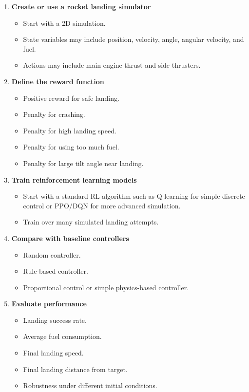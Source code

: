\documentclass[11pt,a4paper]{article}
\begin{document}
\begin{enumerate}
    \item \textbf{Create or use a rocket landing simulator}
    \begin{itemize}
        \item Start with a 2D simulation.
        \item State variables may include position, velocity, angle, angular velocity, and fuel.
        \item Actions may include main engine thrust and side thrusters.
    \end{itemize}

    \item \textbf{Define the reward function}
    \begin{itemize}
        \item Positive reward for safe landing.
        \item Penalty for crashing.
        \item Penalty for high landing speed.
        \item Penalty for using too much fuel.
        \item Penalty for large tilt angle near landing.
    \end{itemize}

    \item \textbf{Train reinforcement learning models}
    \begin{itemize}
        \item Start with a standard RL algorithm such as Q-learning for simple discrete control or PPO/DQN for more advanced simulation.
        \item Train over many simulated landing attempts.
    \end{itemize}

    \item \textbf{Compare with baseline controllers}
    \begin{itemize}
        \item Random controller.
        \item Rule-based controller.
        \item Proportional control or simple physics-based controller.
    \end{itemize}

    \item \textbf{Evaluate performance}
    \begin{itemize}
        \item Landing success rate.
        \item Average fuel consumption.
        \item Final landing speed.
        \item Final landing distance from target.
        \item Robustness under different initial conditions.
    \end{itemize}
\end{enumerate}
\end{document}
